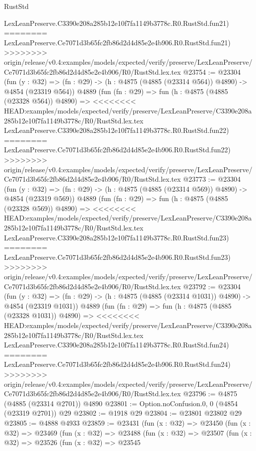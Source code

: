 \begin{lexlean}{RustStd}
\begin{coremodule}
{\begin{coremodule}
{{{{{{{{{{{{{{{{{{{{{{{{{{{{{    LexLeanPreserve.C3390e208a285b12e10f7fa1149b3778c.R0.RustStd.fun21)
========
    LexLeanPreserve.Ce7071d3b65fc2fb86d2d4d85e2e4b906.R0.RustStd.fun21)
>>>>>>>> origin/release/v0.4:examples/models/expected/verify/preserve/LexLeanPreserve/Ce7071d3b65fc2fb86d2d4d85e2e4b906/R0/RustStd.lex.tex
@23754 := @23304
    (fun (y : @32) => (fn : @29) -> (h : @4875 (@4885 (@23314 @564)) @4890) -> @4854 (@23319 @564))
    @4889
    (fun (fn : @29) =>
    fun (h : @4875 (@4885 (@23328 @564)) @4890) =>
<<<<<<<< HEAD:examples/models/expected/verify/preserve/LexLeanPreserve/C3390e208a285b12e10f7fa1149b3778c/R0/RustStd.lex.tex
    LexLeanPreserve.C3390e208a285b12e10f7fa1149b3778c.R0.RustStd.fun22)
========
    LexLeanPreserve.Ce7071d3b65fc2fb86d2d4d85e2e4b906.R0.RustStd.fun22)
>>>>>>>> origin/release/v0.4:examples/models/expected/verify/preserve/LexLeanPreserve/Ce7071d3b65fc2fb86d2d4d85e2e4b906/R0/RustStd.lex.tex
@23773 := @23304
    (fun (y : @32) => (fn : @29) -> (h : @4875 (@4885 (@23314 @569)) @4890) -> @4854 (@23319 @569))
    @4889
    (fun (fn : @29) =>
    fun (h : @4875 (@4885 (@23328 @569)) @4890) =>
<<<<<<<< HEAD:examples/models/expected/verify/preserve/LexLeanPreserve/C3390e208a285b12e10f7fa1149b3778c/R0/RustStd.lex.tex
    LexLeanPreserve.C3390e208a285b12e10f7fa1149b3778c.R0.RustStd.fun23)
========
    LexLeanPreserve.Ce7071d3b65fc2fb86d2d4d85e2e4b906.R0.RustStd.fun23)
>>>>>>>> origin/release/v0.4:examples/models/expected/verify/preserve/LexLeanPreserve/Ce7071d3b65fc2fb86d2d4d85e2e4b906/R0/RustStd.lex.tex
@23792 := @23304
    (fun (y : @32) =>
    (fn : @29) -> (h : @4875 (@4885 (@23314 @1031)) @4890) -> @4854 (@23319 @1031))
    @4889
    (fun (fn : @29) =>
    fun (h : @4875 (@4885 (@23328 @1031)) @4890) =>
<<<<<<<< HEAD:examples/models/expected/verify/preserve/LexLeanPreserve/C3390e208a285b12e10f7fa1149b3778c/R0/RustStd.lex.tex
    LexLeanPreserve.C3390e208a285b12e10f7fa1149b3778c.R0.RustStd.fun24)
========
    LexLeanPreserve.Ce7071d3b65fc2fb86d2d4d85e2e4b906.R0.RustStd.fun24)
>>>>>>>> origin/release/v0.4:examples/models/expected/verify/preserve/LexLeanPreserve/Ce7071d3b65fc2fb86d2d4d85e2e4b906/R0/RustStd.lex.tex
@23796 := @4875 (@4885 (@23314 @2701)) @4890
@23801 := Option.noConfusion.{0, 0} (@4854 (@23319 @2701)) @29
@23802 := @1918 @29
@23804 := @23801 @23802 @29
@23805 := @4888 @4933
@23859 := @23431
    (fun (x : @32) =>
    @23450
      (fun (x : @32) =>
      @23469
        (fun (x : @32) =>
        @23488
          (fun (x : @32) =>
          @23507
            (fun (x : @32) =>
            @23526
              (fun (x : @32) =>
              @23545
}}}}}}}}}}}}}}}}}}}}}}}}}}}}}
\end{coremodule}}
\end{coremodule}
\end{lexlean}
